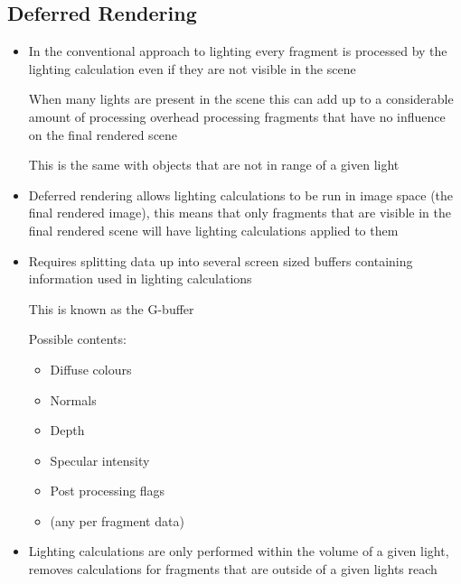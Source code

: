 \documentclass[a4paper]{article}
\begin{document}
\subsection{Deferred Rendering}

\begin{itemize}
  \item
    In the conventional approach to lighting every fragment is processed by the
    lighting calculation even if they are not visible in the scene

    When many lights are present in the scene this can add up to a considerable
    amount of processing overhead processing fragments that have no influence on
    the final rendered scene

    This is the same with objects that are not in range of a given light

  \item
    Deferred rendering allows lighting calculations to be run in image space
    (the final rendered image), this means that only fragments that are visible
    in the final rendered scene will have lighting calculations applied to them

  \item
    Requires splitting data up into several screen sized buffers containing
    information used in lighting calculations

    This is known as the G-buffer

    Possible contents:
    \begin{itemize}
      \item
        Diffuse colours

      \item
        Normals

      \item
        Depth

      \item
        Specular intensity

      \item
        Post processing flags

      \item
        (any per fragment data)

    \end{itemize}

  \item
    Lighting calculations are only performed within the volume of a given light,
    removes calculations for fragments that are outside of a given lights reach


\end{itemize}
\end{document}
